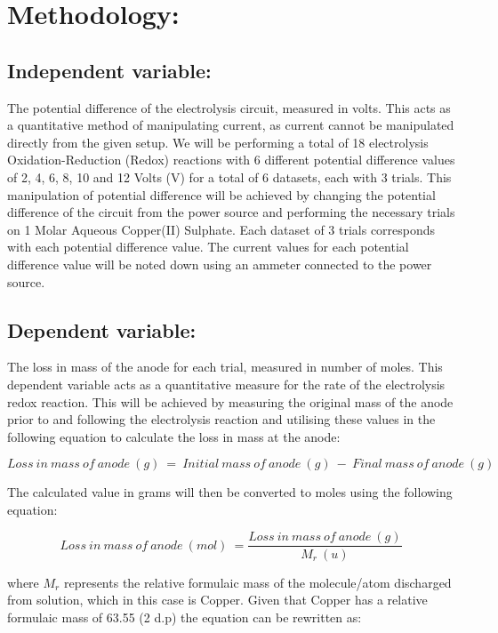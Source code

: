 \documentclass[11pt, a4]{article}
\begin{document}
	\section{Methodology:}
		\subsection{Independent variable:}
			The potential difference of the electrolysis circuit, measured in volts. This acts as a quantitative method of manipulating current, as current cannot be manipulated directly from the given setup. We will be performing a total of 18 electrolysis Oxidation-Reduction (Redox) reactions with 6 different potential difference values of 2, 4, 6, 8, 10 and 12 Volts (V) for a total of 6 datasets, each with 3 trials. This manipulation of potential difference will be achieved by changing the potential difference of the circuit from the power source and performing the necessary trials on 1 Molar Aqueous Copper(II) Sulphate. Each dataset of 3 trials corresponds with each potential difference value. The current values for each potential difference value will be noted down using an ammeter connected to the power source.
			
		\subsection{Dependent variable:}
			The loss in mass of the anode for each trial, measured in number of moles. This dependent variable acts as a quantitative measure for the rate of the electrolysis redox reaction. This will be achieved by measuring the original mass of the anode prior to and following the electrolysis reaction and utilising these values in the following equation to calculate the loss in mass at the anode:
			
			\begin{equation}
				Loss \ in \ mass \ of \ anode \ (g) \ = \ Initial \ mass \ of \ anode \ (g) \ - \ Final \ mass \ of \ anode \ (g)
			\end{equation}
			
			The calculated value in grams will then be converted to moles using the following equation:
			
			\begin{equation}
				Loss \ in \ mass \ of \ anode \ (mol) \ = \frac{Loss \ in \ mass \ of \ anode \ (g)}{M_{r} \ (u)}
			\end{equation}
			
			where $M_{r}$ represents the relative formulaic mass of the molecule/atom discharged from solution, which in this case is Copper. Given that Copper has a relative formulaic mass of 63.55 (2 d.p) the equation can be rewritten as:
			
\end{document}

